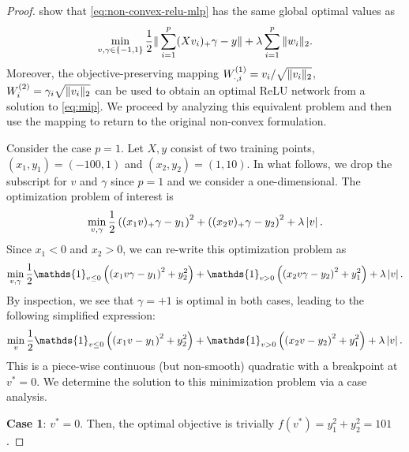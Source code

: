 \oneNeuron*
\begin{proof}
    \citet{mishkin2022convex} show that \autoref{eq:non-convex-relu-mlp} has the same global optimal values as
    \begin{equation}\label{eq:mip}
        \min_{v, \gamma \in \left\{-1, 1\right\}} \frac 1 2 \|\sum_{i=1}^p (X v_i)_+ \gamma - y\| + \lambda \sum_{i = 1}^p \|w_i\|_2.
    \end{equation}
    Moreover, the objective-preserving mapping
    \( W^{(1)}_{\cdot, i} = v_i / \sqrt{\|v_i\|_2} \),
    \( W^{(2)}_{i} = \gamma_i \sqrt{\|v_i\|_2} \)
    can be used to obtain an optimal ReLU network from a solution to \cref{eq:mip}.
    We proceed by analyzing this equivalent problem and then use the
    mapping to return to the original non-convex formulation.

    Consider the case \( p = 1 \).
    Let \( X, y \) consist of two training points, \( (x_1, y_1) = (-100, 1) \) and \( (x_2, y_2) = (1, 10) \).
    In what follows, we drop the subscript for \( v \) and \( \gamma \) since \( p = 1 \) and we consider a one-dimensional.
    The optimization problem of interest is
    \begin{equation*}
        \min_{v, \gamma} \frac 1 2 \left((x_1 v)_+ \gamma - y_1\right)^2 + \left((x_2 v)_+ \gamma - y_2\right)^2 + \lambda \left\vert v\right\vert.
    \end{equation*}
    Since \( x_1 < 0 \) and \( x_2 > 0 \), we can re-write this optimization problem as
    \[
        \min_{v, \gamma} \half \mathds{1}_{v \leq 0} \rbr{\rbr{x_1 v \gamma - y_1}^2 + y_2^2} + \mathds{1}_{v > 0}\rbr{\rbr{x_2 v \gamma - y_2}^2 + y_1^2} + \lambda \abs{v}.
    \]
    By inspection, we see that \( \gamma = +1 \) is optimal in both cases, leading to the following simplified expression:
    \[
        \min_{v} \half \mathds{1}_{v \leq 0} \rbr{\rbr{x_1 v - y_1}^2 + y_2^2} + \mathds{1}_{v > 0}\rbr{\rbr{x_2 v - y_2}^2 + y_1^2} + \lambda \abs{v}.
    \]
    This is a piece-wise continuous (but non-smooth) quadratic with a breakpoint at \( v^* = 0 \).
    We determine the solution to this minimization problem via a case analysis.

    \textbf{Case 1}: \( v^* = 0 \).
    Then, the optimal objective is trivially \( f(v^*) = y_1^2 + y_2^2 = 101 \).


\end{proof}
